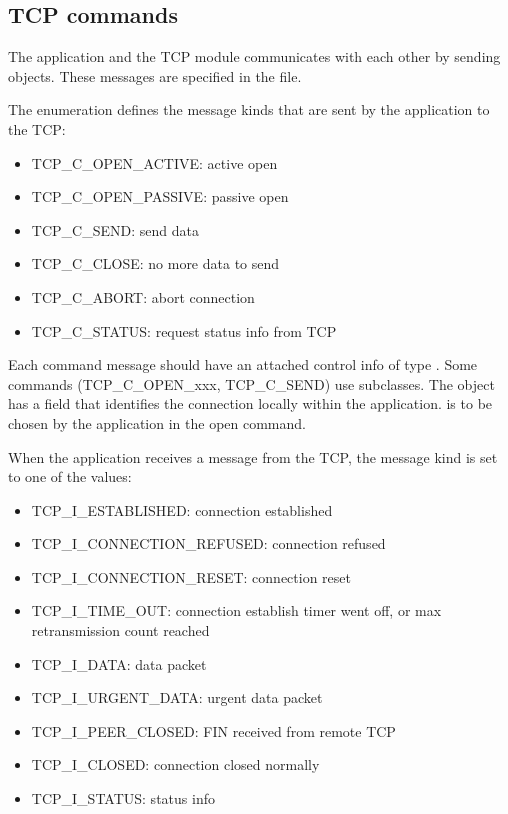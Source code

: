 \subsection{TCP commands}

The application and the TCP module communicates with each other
by sending  objects. These messages are specified
in the  file.

The  enumeration defines the message kinds
that are sent by the application to the TCP:
\begin{itemize}
  \item TCP\_C\_OPEN\_ACTIVE: active open
  \item TCP\_C\_OPEN\_PASSIVE: passive open
  \item TCP\_C\_SEND: send data
  \item TCP\_C\_CLOSE: no more data to send
  \item TCP\_C\_ABORT: abort connection
  \item TCP\_C\_STATUS: request status info from TCP
\end{itemize}

Each command message should have an attached control info of type .
Some commands (TCP\_C\_OPEN\_xxx, TCP\_C\_SEND) use subclasses.
The  object has a  field that identifies the
connection locally within the application.  is to be chosen by the
application in the open command.

When the application receives a message from the TCP, the message kind is
set to one of the  values:
\begin{itemize}
  \item TCP\_I\_ESTABLISHED: connection established
  \item TCP\_I\_CONNECTION\_REFUSED: connection refused
  \item TCP\_I\_CONNECTION\_RESET: connection reset
  \item TCP\_I\_TIME\_OUT: connection establish timer went off, or max retransmission count reached
  \item TCP\_I\_DATA: data packet
  \item TCP\_I\_URGENT\_DATA: urgent data packet
  \item TCP\_I\_PEER\_CLOSED: FIN received from remote TCP
  \item TCP\_I\_CLOSED: connection closed normally
  \item TCP\_I\_STATUS: status info
\end{itemize}

